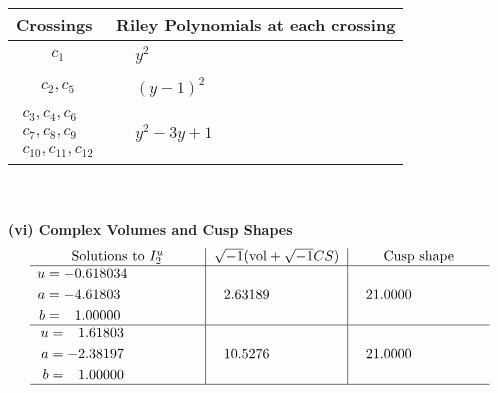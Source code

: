 \documentclass[1p]{elsarticle_modified}
\theoremstyle{definition}
\newcommand{\I}{\sqrt{-1}}
\begin{document}
\begin{tabular}{m{50pt}|m{274pt}}
Crossings & \hspace{64pt}Riley Polynomials at each crossing \\
\hline $$\begin{aligned}c_{1}\end{aligned}$$&$\begin{aligned}
&y^2
\end{aligned}$\\
\hline $$\begin{aligned}c_{2},c_{5}\end{aligned}$$&$\begin{aligned}
&(y-1)^2
\end{aligned}$\\
\hline $$\begin{aligned}c_{3},c_{4},c_{6}\\c_{7},c_{8},c_{9}\\c_{10},c_{11},c_{12}\end{aligned}$$&$\begin{aligned}
&y^2-3 y+1
\end{aligned}$\\
\hline
\end{tabular}\\~\\
\newpage\flushleft \textbf{(vi) Complex Volumes and Cusp Shapes}
$$\begin{array}{c|c|c}  
\text{Solutions to }I^u_{2}& \I (\text{vol} + \sqrt{-1}CS) & \text{Cusp shape}\\
 \hline 
\begin{aligned}
u &= -0.618034\phantom{ +0.000000I} \\
a &= -4.61803\phantom{ +0.000000I} \\
b &= \phantom{-}1.00000\phantom{ +0.000000I}\end{aligned}
 & \phantom{-}2.63189\phantom{ +0.000000I} & \phantom{-}21.0000\phantom{ +0.000000I} \\ \hline\begin{aligned}
u &= \phantom{-}1.61803\phantom{ +0.000000I} \\
a &= -2.38197\phantom{ +0.000000I} \\
b &= \phantom{-}1.00000\phantom{ +0.000000I}\end{aligned}
 & \phantom{-}10.5276\phantom{ +0.000000I} & \phantom{-}21.0000\phantom{ +0.000000I}\\
 \hline 
 \end{array}$$\newpage
\newpage\renewcommand{\arraystretch}{1}
\end{document}
